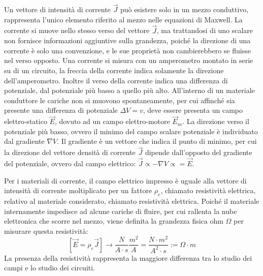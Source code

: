 \documentclass{article}
\numberwithin{equation}{subsection}
\begin{document}
Un vettore di intensità di corrente $\vec{J}$ può esistere solo in un mezzo conduttivo, rappresenta l'unico elemento riferito al mezzo nelle equazioni di Maxwell. La corrente 
si muove nello stesso verso del vettore $\vec{J}$, ma trattandosi di uno scalare non fornisce informazioni aggiuntive sulla grandezza, poiché la direzione di una corrente è 
solo una convenzione, e le sue proprietà non cambierebbero se fluisse nel verso opposto. Una corrente si misura con un amperometro montato in serie su di un circuito, la freccia 
della corrente indica solamente la direzione dell'amperometro. Inoltre il verso della corrente indica una differenza di potenziale, dal potenziale più basso a quello 
più alto. All'interno di un materiale conduttore le cariche non si muovono spontaneamente, per cui affinché sia presente una differenza di potenziale $\Delta V=v$, deve essere 
presenta un campo elettro-statico $\vec{E}$, dovuto ad un campo elettro-motore $\vec{E}_m$. La direzione verso il potenziale più basso, ovvero il minimo del campo scalare 
potenziale è individuato dal gradiente $\nabla V$. Il gradiente è un vettore che indica il punto di minimo, per cui la direzione del vettore densità di corrente $\vec{J}$ 
dipende dall'opposto del gradiente del potenziale, ovvero dal campo elettrico: $\vec{J}\propto-\nabla V\propto=\vec{E}$. 

\begin{center}
\end{center}

Per i materiali di corrente, il campo elettrico impresso è uguale alla vettore di intensità di corrente moltiplicato per un fattore $\rho_e$, chiamato resistività elettrica, 
relativo al materiale considerato, chiamato resistività elettrica. Poiché il materiale internamente impedisce ad alcune cariche di fluire, per cui rallenta la nube elettronica 
che scorre nel mezzo, viene definita la grandezza fisica ohm $\Omega$ per misurare questa resistività:
\begin{equation*}
    \displaystyle\left[\vec{E}=\rho_{e}\vec{J}\right]\to\frac{N}{A\cdot s}\frac{m^2}{A}=\frac{N\cdot m^2}{A^2\cdot s}:=\Omega\cdot m
\end{equation*}
La presenza della resistività rappresenta la maggiore differenza tra lo studio dei campi e lo studio dei circuiti.  
\end{document}
